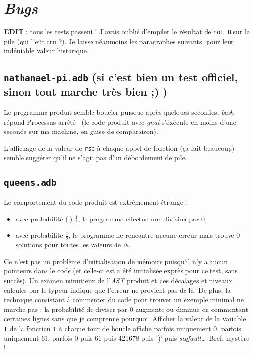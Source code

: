 \documentclass[a4paper, 10pt, french]{article}
\newcommand{\codeAda}[1]{\texttt{#1}}
\newcommand{\codeASM}[1]{\texttt{#1}}
\newcommand{\code}[1]{\texttt{#1}}
\newcommand{\foreign}{\emph}
\begin{document}
\clearpage
\section{\foreign{Bugs}}

\textbf{EDIT} : tous les tests passent ! J'avais oublié d'empiler le résultat de \codeAda{not B} sur la pile (qui l'eût cru ?). Je laisse néanmoins les paragraphes suivants, pour leur indéniable valeur historique.

\subsection{\code{nathanael-pi.adb} (si c'est bien un test officiel, sinon tout marche très bien ;) )}

Le programme produit semble boucler puisque après quelques secondes, \foreign{bash} répond \og Processus arrêté \fg\ (le code produit avec \foreign{gnat} s'éxécute en moins d'une seconde sur ma machine, en guise de comparaison).

L'affichage de la valeur de \codeASM{rsp} à chaque appel de fonction (ça fait beaucoup) semble suggérer qu'il ne s'agit pas d'un débordement de pile.

\subsection{\code{queens.adb}}

Le comportement du code produit est extrêmement étrange :
\begin{itemize}
 \item avec probabilité (!) $\frac{1}{2}$, le programme effectue une division par 0,
 \item avec probabilite $\frac{1}{2}$, le programme ne rencontre aucune erreur mais trouve 0 solutions pour toutes les valeurs de $N$.
\end{itemize}

Ce n'est pas un problème d'initialisation de mémoire puisqu'il n'y a aucun pointeurs dans le code (et celle-ci est a été initialisée exprès pour ce test, sans succès). Un examen minutieux de l'\foreign{AST} produit et des décalages et niveaux calculés par le typeur indique que l'erreur ne provient pas de là. De plus, la technique consistant à commenter du code pour trouver un exemple minimal ne marche pas : la probabilité de diviser par 0 augmente ou diminue en commentant certaines lignes sans que je comprenne pourquoi. Afficher la valeur de la variable \codeAda{I} de la fonction \codeAda{T} à chaque tour de boucle affiche parfois uniquement 0, parfois uniquement 61, parfois 0 puis 61 puis 421678 puis ')' puis \foreign{segfault}\ldots\ Bref, mystère !
\end{document}

